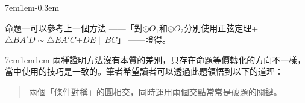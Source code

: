 \documentclass[12pt]{article}
\begin{document}
\begin{mybox}[Answer 11*]{7em}{1em}{-0.3em}
\begin{enumerate}[label = 方法 \arabic*：]
        命題一可以參考上一個方法
        ——「對$\odot{O_1}$和$\odot{O_2}$分別使用正弦定理+$\triangle{BA'D}\sim\triangle{EA'C}$+$DE\parallel BC$」
        ——證得。
    \end{enumerate}  
\end{mybox}
\begin{mybox}[Analysis 11*]{7em}{1em}{1em}
    兩種證明方法沒有本質的差別，只存在命題等價轉化的方向不一樣，當中使用的技巧是一致的。筆者希望讀者可以透過此題領悟到以下的道理：
    \begin{quote}
        兩個「條件對稱」的圓相交，同時運用兩個交點常常是破題的關鍵。
    \end{quote}
\end{mybox}
\end{document}
